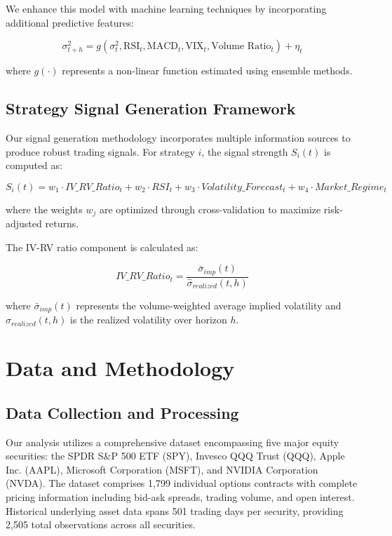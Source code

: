 \documentclass[12pt,a4paper]{article}
\begin{document}
We enhance this model with machine learning techniques by incorporating additional predictive features:

\begin{equation}
\sigma_{t+h}^2 = g(\sigma_t^2, \text{RSI}_t, \text{MACD}_t, \text{VIX}_t, \text{Volume Ratio}_t) + \eta_t
\label{eq:ml_volatility}
\end{equation}

where $g(\cdot)$ represents a non-linear function estimated using ensemble methods.

\subsection{Strategy Signal Generation Framework}

Our signal generation methodology incorporates multiple information sources to produce robust trading signals. For strategy $i$, the signal strength $S_i(t)$ is computed as:

\begin{equation}
S_i(t) = w_1 \cdot IV\_RV\_Ratio_t + w_2 \cdot RSI_t + w_3 \cdot Volatility\_Forecast_t + w_4 \cdot Market\_Regime_t
\label{eq:signal_generation}
\end{equation}

where the weights $w_j$ are optimized through cross-validation to maximize risk-adjusted returns.

The IV-RV ratio component is calculated as:

\begin{equation}
IV\_RV\_Ratio_t = \frac{\bar{\sigma}_{imp}(t)}{\hat{\sigma}_{realized}(t,h)}
\label{eq:iv_rv_ratio}
\end{equation}

where $\bar{\sigma}_{imp}(t)$ represents the volume-weighted average implied volatility and $\hat{\sigma}_{realized}(t,h)$ is the realized volatility over horizon $h$.

\section{Data and Methodology}

\subsection{Data Collection and Processing}

Our analysis utilizes a comprehensive dataset encompassing five major equity securities: the SPDR S\&P 500 ETF (SPY), Invesco QQQ Trust (QQQ), Apple Inc. (AAPL), Microsoft Corporation (MSFT), and NVIDIA Corporation (NVDA). The dataset comprises 1,799 individual options contracts with complete pricing information including bid-ask spreads, trading volume, and open interest. Historical underlying asset data spans 501 trading days per security, providing 2,505 total observations across all securities.
\end{document}
